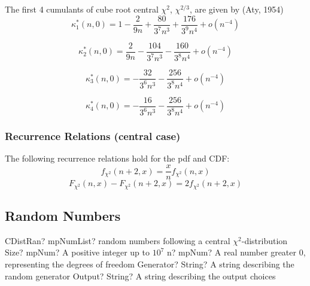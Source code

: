 The first 4 cumulants of cube root central $\chi^{2}$, $\chi^{2/3}$, are given by (Aty, 1954)
\begin{equation}
\kappa^*_1(n,0) = 1 - \frac{2}{9n} + \frac{80}{3^7 n^3} + \frac{176}{3^9 n^4} + o(n^{-4})
\end{equation}

\begin{equation}
\kappa^*_2(n,0) = \frac{2}{9n} - \frac{104}{3^7 n^3} - \frac{160}{3^8 n^4} + o(n^{-4})
\end{equation}


\begin{equation}
\kappa^*_3(n,0) = - \frac{32}{3^6 n^3} - \frac{256}{3^8 n^4} + o(n^{-4})
\end{equation}

\begin{equation}
\kappa^*_4(n,0) = - \frac{16}{3^6 n^3} - \frac{256}{3^8 n^4} + o(n^{-4})
\end{equation} 




\subsubsection{Recurrence Relations (central case)}
The following recurrence relations hold for the pdf and CDF:
\begin{equation}
f_{\chi^2}(n+2, x) = \frac{x}{n} f_{\chi^2}(n, x)
\end{equation}
\begin{equation}
F_{\chi^2}(n, x)  - F_{\chi^2}(n+2, x) = 2f_{\chi^2}(n+2, x)
\end{equation}







\subsection{Random Numbers}
\label{ChiSquareDistributionRandom}

\begin{mpFunctionsExtract}
	\mpFunctionFourNotImplemented
	{CDistRan? mpNumList? random numbers following a central $\chi^2$-distribution}
	{Size? mpNum? A positive integer up to $10^7$}
	{n? mpNum? A real number greater 0, representing the degrees of freedom}
	{Generator? String? A string describing the random generator}
	{Output? String? A string describing the output choices}
\end{mpFunctionsExtract}


